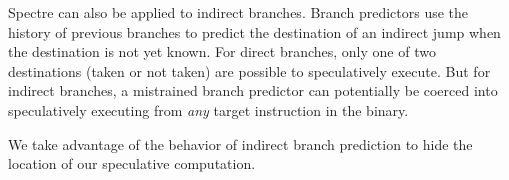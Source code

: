 Spectre can also be applied to indirect branches. Branch predictors use the
history of previous branches to predict the destination of an indirect jump when
the destination is not yet known. For direct branches, only one of two
destinations (taken or not taken) are possible to speculatively execute. But for
indirect branches, a mistrained branch predictor can potentially be coerced into
speculatively executing from \emph{any} target instruction in the binary.

We take advantage of the behavior of indirect branch prediction to hide the
location of our speculative computation.

